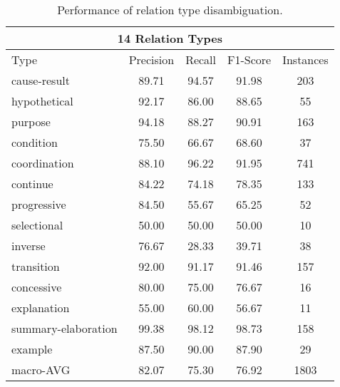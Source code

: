\begin{table}[!htbp]
\begin{tabular}{|l|c|c|c|c|}
\multicolumn{5}{|c|}{14 Relation Types}                                             \\ \hline
    Type                &     Precision &     Recall &     F1-Score &     Instances \\ \hline
    cause-result        &     89.71     &     94.57  &     91.98    &     203       \\ \hline
    hypothetical        &     92.17     &     86.00  &     88.65    &     55        \\ \hline
    purpose             &     94.18     &     88.27  &     90.91    &     163       \\ \hline
    condition           &     75.50     &     66.67  &     68.60    &     37        \\ \hline
    coordination        &     88.10     &     96.22  &     91.95    &     741       \\ \hline
    continue            &     84.22     &     74.18  &     78.35    &     133       \\ \hline
    progressive         &     84.50     &     55.67  &     65.25    &     52        \\ \hline
    selectional         &     50.00     &     50.00  &     50.00    &     10        \\ \hline
    inverse             &     76.67     &     28.33  &     39.71    &     38        \\ \hline
    transition          &     92.00     &     91.17  &     91.46    &     157       \\ \hline
    concessive          &     80.00     &     75.00  &     76.67    &     16        \\ \hline
    explanation         &     55.00     &     60.00  &     56.67    &     11        \\ \hline
    summary-elaboration &     99.38     &     98.12  &     98.73    &     158       \\ \hline
    example             &     87.50     &     90.00  &     87.90    &     29        \\ \hline
    macro-AVG           &     82.07     &     75.30  &     76.92    &     1803      \\ \hline

\end{tabular}
\caption{\label{t:sense-types} Performance of relation type
disambiguation. }
\end{table}
